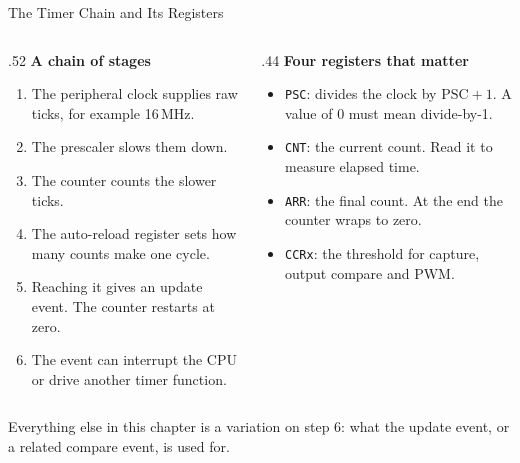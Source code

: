 \documentclass[9pt,aspectratio=169,xcolor=table]{beamer}
\begin{document}
\begin{frame}{The Timer Chain and Its Registers}
    \begin{columns}[T]
    \begin{column}{.52\textwidth}
        \textbf{A chain of stages}
        {\small
        \begin{enumerate}\itemsep1pt
            \item The peripheral clock supplies raw ticks, for example 16\,MHz.
            \item The \alert{prescaler} slows them down.
            \item The \alert{counter} counts the slower ticks.
            \item The \alert{auto-reload} register sets how many counts make one cycle.
            \item Reaching it gives an \alert{update event}. The counter restarts at zero.
            \item The event can interrupt the CPU or drive another timer function.
        \end{enumerate}}
    \end{column}
    \begin{column}{.44\textwidth}
        \textbf{Four registers that matter}
        {\small
        \begin{itemize}\itemsep1pt
            \item \texttt{PSC}: divides the clock by $\text{PSC}+1$. A value of 0 must mean divide-by-1.
            \item \texttt{CNT}: the current count. Read it to measure elapsed time.
            \item \texttt{ARR}: the final count. At the end the counter wraps to zero.
            \item \texttt{CCRx}: the threshold for capture, output compare and PWM.
        \end{itemize}}
    \end{column}
    \end{columns}

    \vspace{2mm}
    {\small \alert{Everything else in this chapter is a variation on step 6:} what the update event, or a related compare event, is used for.}
\end{frame}
\end{document}
